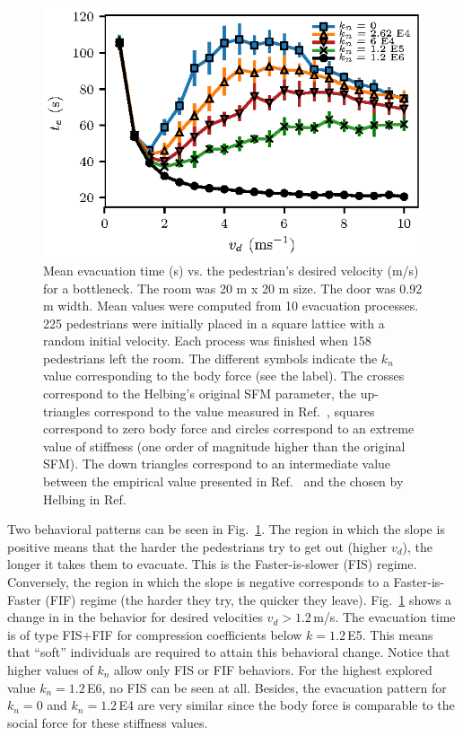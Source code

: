\documentclass[preprint,12pt]{elsarticle}
\begin{document}
\begin{figure}[htbp!]
\centering
\includegraphics[width=0.7\columnwidth]
{./vd_vs_te_N225.eps}
\caption{\label{vd_vs_te}Mean evacuation time (s) vs. the pedestrian’s desired  
velocity (m/s) for a bottleneck. The room was 20 m x 20 m size. The door was 
0.92 m width. Mean values were computed from 10 evacuation processes. 225 
pedestrians were initially placed in a square lattice with a random initial 
velocity. Each process was finished when 158 pedestrians left the room. The 
different symbols indicate the $k_n$ value corresponding to the body force (see 
the label). The crosses correspond to the Helbing's original SFM parameter, the 
up-triangles correspond to the value measured in 
Ref.~\cite{anthropometric}, squares correspond 
to zero body force and circles correspond to an extreme value of stiffness (one 
order of magnitude higher than the original SFM). The 
 down triangles correspond to an intermediate value between the empirical value 
presented in Ref.~\cite{anthropometric} and the chosen by Helbing in 
Ref.~\cite{helbing_2000} }
\end{figure}

Two behavioral patterns can be seen in Fig.~\ref{vd_vs_te}. 
The region in which the slope is positive means that the 
harder the pedestrians try to get out (higher $v_d$), the 
longer it takes them to evacuate. This is the Faster-is-slower 
(FIS) regime. Conversely, the region in which the slope is 
negative  corresponds to a Faster-is-Faster (FIF) regime (the 
harder they try, the quicker they leave). Fig.~\ref{vd_vs_te} shows a change in 
in the behavior for desired velocities $v_d>1.2\,$m/s. The 
evacuation time is of type FIS+FIF for compression coefficients below 
$k=1.2\,$E5. This means that ``soft'' individuals are required to attain this 
behavioral change.  Notice that higher values of $k_n$ allow 
only FIS or FIF behaviors. For the highest explored value $k_n=1.2\,$E6, no 
FIS can be seen at all. Besides, the evacuation pattern for $k_n = 0$ and $k_n 
= 1.2\,$E4 are very similar since the body force is comparable to the social 
force for these stiffness values. \\
\end{document}
